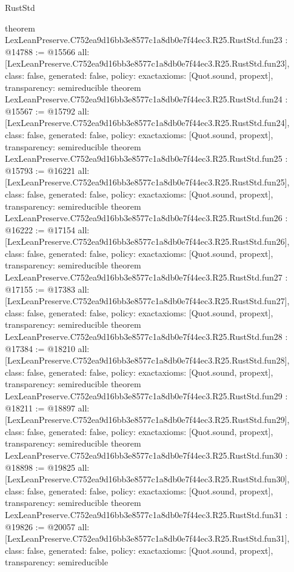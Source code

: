 \begin{lexlean}{RustStd}
\begin{coremodule}
{}
theorem LexLeanPreserve.C752ea9d16bb3e8577c1a8db0e7f44ec3.R25.RustStd.fun23 : @14788 := @15566 {
  all: [LexLeanPreserve.C752ea9d16bb3e8577c1a8db0e7f44ec3.R25.RustStd.fun23],
  class: false,
  generated: false,
  policy: exact{axioms: [Quot.sound, propext]},
  transparency: semireducible
}
theorem LexLeanPreserve.C752ea9d16bb3e8577c1a8db0e7f44ec3.R25.RustStd.fun24 : @15567 := @15792 {
  all: [LexLeanPreserve.C752ea9d16bb3e8577c1a8db0e7f44ec3.R25.RustStd.fun24],
  class: false,
  generated: false,
  policy: exact{axioms: [Quot.sound, propext]},
  transparency: semireducible
}
theorem LexLeanPreserve.C752ea9d16bb3e8577c1a8db0e7f44ec3.R25.RustStd.fun25 : @15793 := @16221 {
  all: [LexLeanPreserve.C752ea9d16bb3e8577c1a8db0e7f44ec3.R25.RustStd.fun25],
  class: false,
  generated: false,
  policy: exact{axioms: [Quot.sound, propext]},
  transparency: semireducible
}
theorem LexLeanPreserve.C752ea9d16bb3e8577c1a8db0e7f44ec3.R25.RustStd.fun26 : @16222 := @17154 {
  all: [LexLeanPreserve.C752ea9d16bb3e8577c1a8db0e7f44ec3.R25.RustStd.fun26],
  class: false,
  generated: false,
  policy: exact{axioms: [Quot.sound, propext]},
  transparency: semireducible
}
theorem LexLeanPreserve.C752ea9d16bb3e8577c1a8db0e7f44ec3.R25.RustStd.fun27 : @17155 := @17383 {
  all: [LexLeanPreserve.C752ea9d16bb3e8577c1a8db0e7f44ec3.R25.RustStd.fun27],
  class: false,
  generated: false,
  policy: exact{axioms: [Quot.sound, propext]},
  transparency: semireducible
}
theorem LexLeanPreserve.C752ea9d16bb3e8577c1a8db0e7f44ec3.R25.RustStd.fun28 : @17384 := @18210 {
  all: [LexLeanPreserve.C752ea9d16bb3e8577c1a8db0e7f44ec3.R25.RustStd.fun28],
  class: false,
  generated: false,
  policy: exact{axioms: [Quot.sound, propext]},
  transparency: semireducible
}
theorem LexLeanPreserve.C752ea9d16bb3e8577c1a8db0e7f44ec3.R25.RustStd.fun29 : @18211 := @18897 {
  all: [LexLeanPreserve.C752ea9d16bb3e8577c1a8db0e7f44ec3.R25.RustStd.fun29],
  class: false,
  generated: false,
  policy: exact{axioms: [Quot.sound, propext]},
  transparency: semireducible
}
theorem LexLeanPreserve.C752ea9d16bb3e8577c1a8db0e7f44ec3.R25.RustStd.fun30 : @18898 := @19825 {
  all: [LexLeanPreserve.C752ea9d16bb3e8577c1a8db0e7f44ec3.R25.RustStd.fun30],
  class: false,
  generated: false,
  policy: exact{axioms: [Quot.sound, propext]},
  transparency: semireducible
}
theorem LexLeanPreserve.C752ea9d16bb3e8577c1a8db0e7f44ec3.R25.RustStd.fun31 : @19826 := @20057 {
  all: [LexLeanPreserve.C752ea9d16bb3e8577c1a8db0e7f44ec3.R25.RustStd.fun31],
  class: false,
  generated: false,
  policy: exact{axioms: [Quot.sound, propext]},
  transparency: semireducible
}
\end{coremodule}
\end{lexlean}
